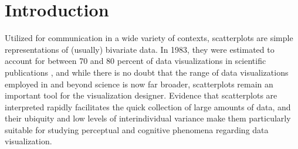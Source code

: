 \documentclass[manuscript,screen,review,anonymous]{acmart}
\begin{document}



\maketitle

\setlength{\parskip}{-0.1pt}

\section{Introduction}\label{sec-intro}

Utilized for communication in a wide variety of contexts, scatterplots
are simple representations of (usually) bivariate data. In 1983, they
were estimated to account for between 70 and 80 percent of data
visualizations in scientific publications \citep{tufte_1983}, and while
there is no doubt that the range of data visualizations employed in and
beyond science is now far broader, scatterplots remain an important tool
for the visualization designer. Evidence that scatterplots are
interpreted rapidly \citep{rensink_2014} facilitates the quick
collection of large amounts of data, and their ubiquity
\citep{tufte_1983} and low levels of interindividual variance
\citep{kay_2015} make them particularly suitable for studying perceptual
and cognitive phenomena regarding data visualization.
\end{document}
